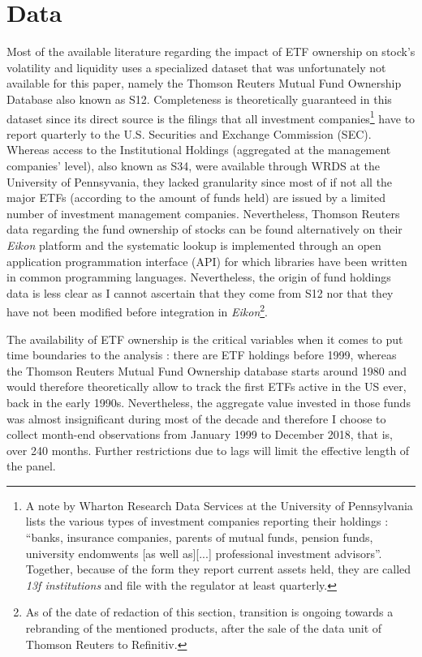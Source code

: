 \section{Data}
Most of the available literature regarding the impact of ETF ownership on stock's volatility and liquidity uses a specialized dataset that was unfortunately not available for this paper, namely the Thomson Reuters Mutual Fund Ownership Database also known as S12. Completeness is theoretically guaranteed in this dataset since its direct source is the filings that all investment companies\footnote{A note by Wharton Research Data Services at the University of Pennsylvania lists the various types of investment companies reporting their holdings : ``banks, insurance companies, parents of mutual funds, pension funds, university endomwents [as well as][...] professional investment advisors''. Together, because of the form they report current assets held, they are called \textit{13f institutions} and file with the regulator at least quarterly.} have to report quarterly to the U.S. Securities and Exchange Commission (SEC). Whereas access to the Institutional Holdings (aggregated at the management companies' level), also known as S34, were available through WRDS at the University of Pennsyvania, they lacked granularity since most of if not all the major ETFs (according to the amount of funds held) are issued by a limited number of investment management companies. Nevertheless, Thomson Reuters data regarding the fund ownership of stocks can be found alternatively on their \textit{Eikon} platform and the systematic lookup is implemented through an open application programmation interface (API) for which libraries have been written in common programming languages. Nevertheless, the origin of fund holdings data is less clear as I cannot ascertain that they come from S12 nor that they have not been modified before integration in \textit{Eikon}\footnote{As of the date of redaction of this section, transition is ongoing towards a rebranding of the mentioned products, after the sale of the data unit of Thomson Reuters to Refinitiv.}.

The availability of ETF ownership is the critical variables when it comes to put time boundaries to the analysis : there are ETF holdings before 1999, whereas the Thomson Reuters Mutual Fund Ownership database starts around 1980 and would therefore theoretically allow to track the first ETFs active in the US ever, back in the early 1990s. Nevertheless, the aggregate value invested in those funds was almost insignificant during most of the decade and therefore I choose to collect month-end observations from January 1999 to December 2018, that is, over 240 months. Further restrictions due to lags will limit the effective length of the panel.  
